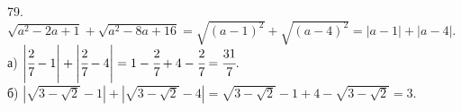 79. $\sqrt{a^2-2a+1}+\sqrt{a^2-8a+16}=\sqrt{(a-1)^2}+\sqrt{(a-4)^2}=|a-1|+|a-4|.$\\
а) $\left|\cfrac{2}{7}-1\right|+\left|\cfrac{2}{7}-4\right|=1-\cfrac{2}{7}+4-\cfrac{2}{7}=\cfrac{31}{7}.$\\
б) $|\sqrt{3-\sqrt{2}}-1|+|\sqrt{3-\sqrt{2}}-4|=\sqrt{3-\sqrt{2}}-1+4-\sqrt{3-\sqrt{2}}=3.$\\
